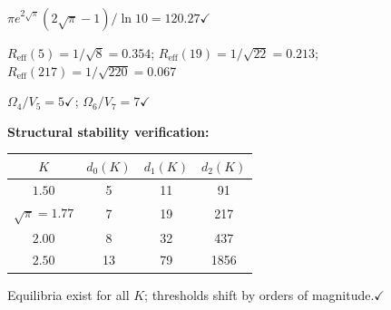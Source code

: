 \documentclass[11pt,a4paper]{article}
\begin{document}
$\pi e^{2\sqrt{\pi}}(2\sqrt{\pi}-1)/\ln 10 = 120.27$\;$\checkmark$

$R_{\mathrm{eff}}(5) = 1/\sqrt{8} = 0.354$\;;\quad
$R_{\mathrm{eff}}(19) = 1/\sqrt{22} = 0.213$\;;\quad
$R_{\mathrm{eff}}(217) = 1/\sqrt{220} = 0.067$

$\Omega_4/V_5 = 5$\;$\checkmark$\;;\quad
$\Omega_6/V_7 = 7$\;$\checkmark$

\textbf{Structural stability verification:}

\begin{center}
\begin{tabular}{cccc}
\toprule
$K$ & $d_0(K)$ & $d_1(K)$ & $d_2(K)$ \\
\midrule
$1.50$ & 5 & 11 & 91 \\
$\sqrt{\pi} = 1.77$ & 7 & 19 & 217 \\
$2.00$ & 8 & 32 & 437 \\
$2.50$ & 13 & 79 & 1856 \\
\bottomrule
\end{tabular}
\end{center}

Equilibria exist for all $K$; thresholds shift by orders of
magnitude.\;$\checkmark$
\end{document}
